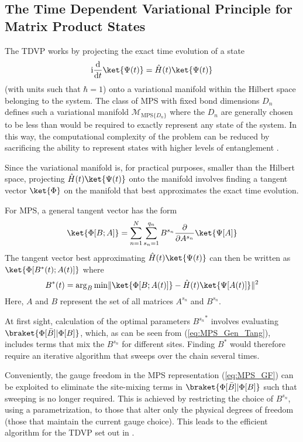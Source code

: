 \documentclass[a4paper,11pt]{article}
\begin{document}
\subsection{The Time Dependent Variational Principle for Matrix Product States}
The TDVP works by projecting the exact time evolution of a state
\begin{equation}
    \mathrm{i} \frac{\mathrm{d}}{\mathrm{d}t} \ket{\Psi(t)} = \hat{H}(t) \ket{\Psi(t)} 
\end{equation}
(with units such that $\hbar = 1$)
onto a variational manifold within the Hilbert space belonging to the system.
The class of MPS with fixed bond dimensions $D_n$ defines such a variational 
manifold $\mathcal{M}_{\mathrm{MPS}\{ D_n \}}$ where the $D_n$ are generally chosen to
be less than would be required to exactly represent any state of the system. In this
way, the computational complexity of the problem can be reduced by sacrificing the
ability to represent states with higher levels of entanglement \cite{vidal_efficient_2003}. 

Since the variational manifold is, for
practical purposes, smaller than the Hilbert space, projecting $\hat{H}(t) \ket{\Psi(t)}$
onto the manifold involves finding a tangent vector $\ket{\Phi}$ on 
the manifold that best approximates the exact time
evolution. 

For MPS, a general tangent vector has the form
\begin{equation}
	\ket{\Phi[B;A]} = \sum^N_{n=1} \sum^{q_n}_{s_n=1} B^{s_n} \frac{\partial}{\partial A^{s_n}} \ket{\Psi[A]}
	\label{eq:MPS_Gen_Tang}
\end{equation}
The tangent vector best approximating $\hat{H}(t) \ket{\Psi(t)}$ can then be written as
$\ket{\Phi[B^*(t);A(t)]}$ where
\begin{equation}
    B^*(t) = \arg_B \mathrm{min} \| \ket{\Phi[B;A(t)]} - \hat{H}(t)\ket{\Psi[A(t)]} \|^2
    \label{eq:TDVP_MPS_OptB}
\end{equation}
Here, $A$ and $B$ represent the set of all matrices $A^{s_n}$ and $B^{s_n}$. 

At first sight, calculation of the optimal parameters ${B^{s_n}}^*$ involves evaluating
$\braket{\Phi[\bar{B}] | \Phi[B]}$, which, as can be seen from (\ref{eq:MPS_Gen_Tang}),
includes terms that mix the ${B^{s_n}}$ for different sites. Finding $B^*$ would
therefore require an iterative algorithm that sweeps over the chain several times.

Conveniently, the gauge freedom in the MPS representation (\ref{eq:MPS_GF}) can 
be exploited to eliminate the site-mixing terms in 
$\braket{\Phi[\bar{B}] | \Phi[B]}$ such that sweeping is no longer required. This
is achieved by restricting the choice of $B^{s_n}$, using a parametrization, 
to those that alter only the physical degrees of freedom (those that
maintain the current gauge choice). This leads to the 
efficient algorithm for the TDVP set out in \cite{haegeman_time-dependent_2011}.
\end{document}
